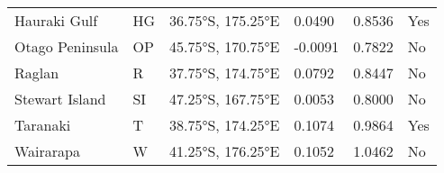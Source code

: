 \documentclass[11pt, a4paper]{article}
\begin{document}
\begin{table}[H]
\begin{tabular}{llllll}
Hauraki Gulf                          & HG                                 & 36.75°S, 175.25°E                       & 0.0490                            & 0.8536                            & Yes                                                  \\
Otago Peninsula                       & OP                                 & 45.75°S, 170.75°E                       & -0.0091                           & 0.7822                            & No                                                   \\
Raglan                                & R                                  & 37.75°S, 174.75°E                       & 0.0792                            & 0.8447                            & No                                                   \\
Stewart Island                        & SI                                 & 47.25°S, 167.75°E                       & 0.0053                            & 0.8000                            & No                                                   \\
Taranaki                              & T                                  & 38.75°S, 174.25°E                       & 0.1074                            & 0.9864                            & Yes                                                  \\
Wairarapa                             & W                                  & 41.25°S, 176.25°E                       & 0.1052                            & 1.0462                            & No
\end{tabular}
\end{table}
\end{document}
